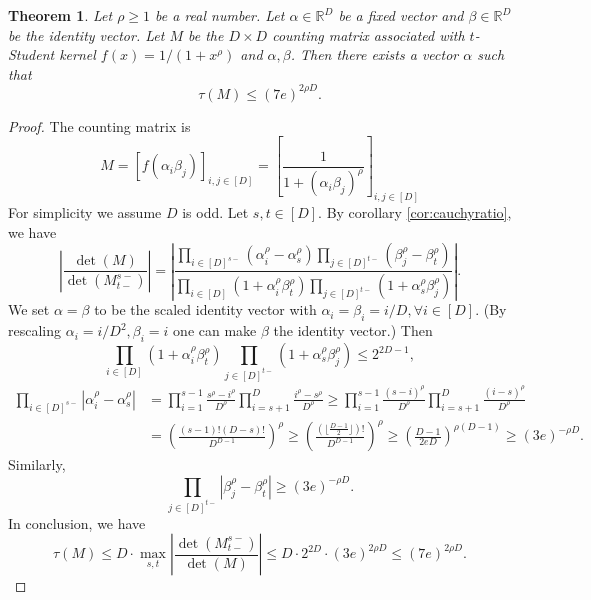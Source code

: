 \documentclass[10pt,a4paper]{article}
\newtheorem{theorem}{Theorem}
\theoremstyle{remark}
\numberwithin{equation}{section}
\numberwithin{theorem}{section}
\newcommand{\R}{\ensuremath{\mathbb{R}}}
\begin{document}
\begin{theorem}
Let $\rho \ge 1$ be a real number. Let $\alpha \in \R^D$ be a fixed vector and $\beta \in \R^D$ be the identity vector.
Let $M$ be the $D \times D$ counting matrix associated with $t$-Student kernel $f(x) = 1/(1+x^{\rho})$ and $\alpha, \beta$. Then there exists a vector $\alpha$ such that
\[\tau(M) \le (7e)^{2\rho D} .\]
\end{theorem}
\begin{proof}
The counting matrix is
\[M = [f(\alpha_i\beta_j)]_{i, j \in [D]} = 
\left[\frac{1}{1 + (\alpha_i\beta_j)^{\rho}}\right]_{i, j \in [D]}\]
For simplicity we assume $D$ is odd. Let $s, t \in [D]$. By corollary \ref{cor:cauchyratio}, we have
\[\left|\frac{\det(M)}{\det(M^{s-}_{t-})}\right|
=\left|\frac{\prod_{i\in [D]^{s-}}(\alpha_i^\rho - \alpha_s^\rho)
\prod_{j\in [D]^{t-}}(\beta_j^\rho - \beta_t^\rho)}
{\prod_{i \in [D]}(1 + \alpha_i^\rho\beta_t^\rho)
\prod_{j \in [D]^{t-}}(1 + \alpha_s^\rho \beta_j^\rho)}\right|.\]
We set $\alpha = \beta$ to be the scaled identity vector with $\alpha_i = \beta_i = i/D, \forall i \in [D]$.
(By rescaling $\alpha_i = i/D^2, \beta_i = i$ one can make $\beta$ the identity vector.)
Then
\[\prod_{i \in [D]}(1 + \alpha_i^\rho\beta_t^\rho)
\prod_{j \in [D]^{t-}}(1 + \alpha_s^\rho \beta_j^\rho) \le 2^{2D-1},\]
\begin{align*}\prod_{i\in [D]^{s-}}|\alpha_i^\rho - \alpha_s^\rho|
&=\prod_{i = 1}^{s-1}\frac{s^\rho - i^\rho}{D^{\rho}}
\prod_{i = s+1}^{D}\frac{i^\rho - s^\rho}{D^{\rho}}
\ge \prod_{i = 1}^{s-1}\frac{(s-i)^\rho}{D^{\rho}}
\prod_{i = s+1}^{D}\frac{(i-s)^\rho}{D^{\rho}} \\
&=\left(\frac{(s-1)!(D-s)!}{D^{D-1}}\right)^\rho
\ge \left(\frac{(\lfloor\frac{D-1}2\rfloor)!}{D^{D-1}}\right)^{\rho}
\ge \left(\frac{D-1}{2eD}\right)^{\rho(D-1)} \ge (3e)^{-\rho D}.
\end{align*}
Similarly,
\[\prod_{j\in [D]^{t-}}|\beta_j^\rho - \beta_t^\rho| \ge (3e)^{-\rho D}.\]
In conclusion, we have
\[\tau(M) \le D \cdot \max_{s, t}\left|\frac{\det(M^{s-}_{t-})}{\det(M)}\right|
\le D \cdot 2^{2D} \cdot (3e)^{2\rho D} \le (7e)^{2\rho D}.\]
\end{proof}
\end{document}
